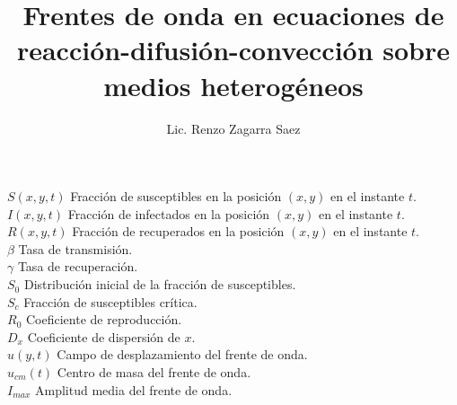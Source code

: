 \documentclass[12pt,screen,twoside,pagebackref,openany]{ibtesis}
\title{Frentes de onda en ecuaciones de reacción-difusión-convección sobre medios heterogéneos}
\author{Lic. Renzo Zagarra Saez}
\begin{document}

\begin{preliminary}



\tableofcontents 

\begin{abreviaturas}
  \noindent
  {$S(x,y,t)$ \hspace*{.3cm} Fracción de susceptibles en la posición $(x,y)$ en el instante $t$.\\
  $I(x,y,t)$ \hspace*{.3cm} Fracción de infectados en la posición $(x,y)$ en el instante $t$.\\
  $R(x,y,t)$ \hspace*{.3cm} Fracción de recuperados en la posición $(x,y)$ en el instante $t$.\\
  $\beta$ \hspace*{.3cm} Tasa de transmisión.\\
  $\gamma$ \hspace*{.3cm} Tasa de recuperación.\\
  $S_0$ \hspace*{.3cm} Distribución inicial de la fracción de susceptibles.\\
  $S_c$ \hspace*{.3cm} Fracción de susceptibles crítica.\\
  $R_0$ \hspace*{.3cm} Coeficiente de reproducción.\\
  $D_{x}$ \hspace*{.3cm} Coeficiente de dispersión de $x$.\\
  $u(y,t)$ \hspace*{.3cm} Campo de desplazamiento del frente de onda.\\
  $u_{cm}(t)$ \hspace*{.3cm} Centro de masa del frente de onda.\\
  $I_{max}$ \hspace*{.3cm} Amplitud media del frente de onda.\\
}
\end{abreviaturas}
\end{preliminary}
\end{document}
